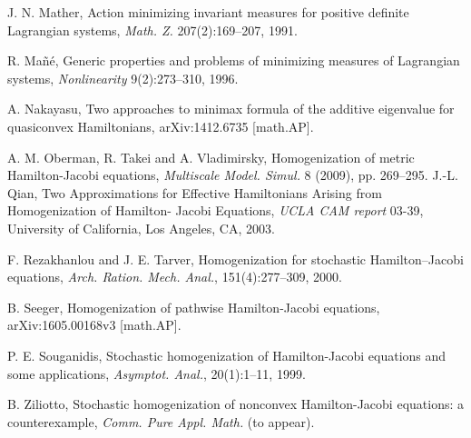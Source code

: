 \documentclass[12pt,reqno]{amsart}
\theoremstyle{plain}
\theoremstyle{remark}
\numberwithin{equation}{section}
\begin{document}
\begin{thebibliography}{99}
J. N. Mather, 
Action minimizing invariant measures for positive definite Lagrangian systems, 
\emph{Math. Z.} 207(2):169--207, 1991.

R. Ma\~n\'e, 
Generic properties and problems of minimizing measures of Lagrangian systems,
\emph{Nonlinearity} 9(2):273--310, 1996.


A. Nakayasu,
Two approaches to minimax formula of the additive eigenvalue for quasiconvex Hamiltonians,
arXiv:1412.6735 [math.AP].

A. M. Oberman, R. Takei and A. Vladimirsky, 
Homogenization of metric Hamilton-Jacobi equations, 
\emph{Multiscale Model. Simul.} 8 (2009), pp. 269--295.
%
%
J.-L. Qian, 
Two Approximations for Effective Hamiltonians Arising from Homogenization of Hamilton- Jacobi Equations, 
\emph{UCLA CAM report} 03-39, University of California, Los Angeles, CA, 2003.

F. Rezakhanlou and J. E. Tarver,
Homogenization for stochastic Hamilton--Jacobi equations,
\emph{Arch. Ration. Mech. Anal.}, 151(4):277--309, 2000.


B. Seeger,   
Homogenization of pathwise Hamilton-Jacobi equations, 
arXiv:1605.00168v3 [math.AP]. 

P. E. Souganidis,
 Stochastic homogenization of Hamilton-Jacobi equations and some applications,
 \emph{Asymptot. Anal.}, 20(1):1--11, 1999.

B. Ziliotto, 
Stochastic homogenization of nonconvex Hamilton-Jacobi equations: a counterexample,
\emph{Comm. Pure Appl. Math.} (to appear).
\end{thebibliography}
\end{document}
